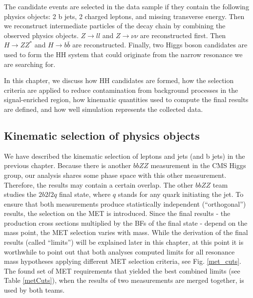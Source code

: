 The candidate events are selected in the data sample if they contain the following physics objects: 2 b jets, 2 charged leptons, and missing transverse energy. Then we reconstruct intermediate particles of the decay chain by combining the observed physics objects. $Z \to ll$ and $Z \to \nu \nu$ are reconstructed first. Then $H \to ZZ^*$ and $H \to b\bar{b}$ are reconstructed. Finally, two Higgs boson candidates are used to form the HH system that could originate from the narrow resonance we are searching for.

In this chapter, we discuss how HH candidates are formed, how the selection criteria are applied to reduce contamination from background processes in the signal-enriched region, how kinematic quantities used to compute the final results are defined, and how well simulation represents the collected data.

\subsection{Kinematic selection of physics objects}
We have described the kinematic selection of leptons and jets (and b jets) in the previous chapter. Because there is another $bbZZ$ measurement in the CMS Higgs group, our analysis shares some phase space with this other measurement. Therefore, the results may contain a certain overlap. The other $bbZZ$ team studies the $2 b 2 l 2 q$ final state, where $q$ stands for any quark initiating the jet. To ensure that both measurements produce statistically independent (``orthogonal'') results, the selection on the MET is introduced. Since the final results - the production cross sections multiplied by the BFs of the final state - depend on the mass point, the MET selection varies with mass. While the derivation of the final results (called ``limits'') will be explained later in this chapter, at this point it is worthwhile to point out that both analyses computed limits for all resonance mass hypotheses applying different MET selection criteria, see Fig. \ref{met_cuts}. The found set of MET requirements that yielded the best combined limits (see Table \ref{metCuts}), when the results of two measurements are merged together, is used by both teams. %

